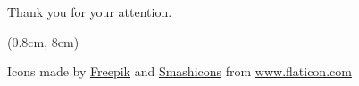 

    
    



\begin{frame}
  \centering
  \vspace{2em}
  Thank you for your attention.

  \begin{textblock*}{1.1\textwidth}(0.8cm, 8cm)
    \begin{flushleft}
    \citesize Icons made by \href{http://www.freepik.com/}{Freepik} and \href{https://smashicons.com/}{Smashicons} from \url{www.flaticon.com}
    \end{flushleft}
  \end{textblock*}

\end{frame}